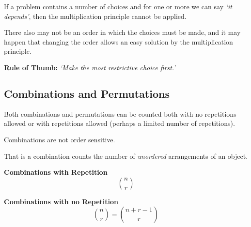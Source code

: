  
\begin{tcolorbox}[title={PST: Restricted Choices First},colback={white},colframe={black},sharp corners,colbacktitle={white},coltitle={black},fonttitle=\bfseries,subtitle style={boxrule=0.4pt,colback=white}]

If a problem contains a number of choices and for one or more we can say \emph{`it depends'}, then the multiplication principle cannot be applied. 

\tcblower
There also may not be an order in which the choices must be made, and it may happen that changing the order allows an easy solution by the multiplication principle.

\tcbline

\textbf{Rule of Thumb:} \textit{`Make the most restrictive choice first.'} 
\end{tcolorbox}
\pagebreak

\subsection{Combinations and Permutations}

Both combinations and permutations can be counted both with no repetitions allowed or with repetitions allowed (perhaps a limited number of repetitions). 

\begin{tcolorbox}[title={Combinations}, colback={white},colframe={black},sharp corners,colbacktitle={white},coltitle={black},fonttitle=\bfseries,subtitle style={boxrule=0.4pt,colback=white}]
		
Combinations are not order sensitive. 

That is a combination counts the number of \emph{unordered} arrangements of an object. 
\tcblower

\small \textbf{Combinations with Repetition} 
\[\binom{n}{r}\]

\tcbline 
\small \textbf{Combinations with no Repetition} 
\[\binom{n}{r} = \binom{n+r-1}{r}\]
\end{tcolorbox}

 
